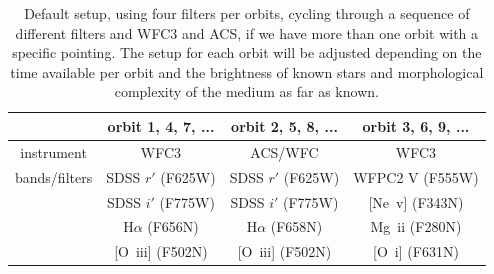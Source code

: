 \documentclass[12pt]{article}
\begin{document}

\begin{table}[htbp]
    \centering
    \begin{tabular}{c|ccc}
    \hline\hline
              & orbit 1, 4, 7, ... & orbit 2, 5, 8, ... & orbit 3, 6, 9, ... \\
              \hline
instrument    & WFC3 & ACS/WFC & WFC3 \\
\hline
bands/filters & SDSS $r'$ (F625W) & SDSS $r'$ (F625W) & 
               WFPC2 V (F555W)\\
              & SDSS $i'$ (F775W) & SDSS $i'$ (F775W) & 
              [Ne~{\sc v}] (F343N)\\
              & H$\alpha$ (F656N) & H$\alpha$ (F658N) & 
              Mg~{\sc ii} (F280N)\\
              & [O~{\sc iii}] (F502N) & [O~{\sc iii}]  (F502N) &
              [O~{\sc i}] (F631N)\\
        \hline
    \end{tabular}
    \caption{Default setup, using four filters per orbits, cycling through a sequence of different filters and WFC3 and ACS, if we have more than one orbit with a specific pointing. The setup for each orbit will be adjusted depending on the time available per orbit and the brightness of known stars and morphological complexity of the medium as far as known.}
    \label{tab:setup}
\end{table}
\end{document}
